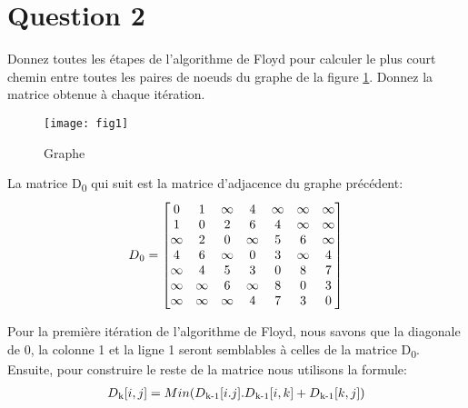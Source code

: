 \documentclass[devoir3.tex]{subfiles}
\begin{document}
\newcommand\hlight[1]{\tikz[overlay, remember picture,baseline=-\the\dimexpr\fontdimen22\textfont2\relax]\node[rectangle,fill=blue!50,rounded corners,fill opacity = 0.2,draw,thick,text opacity =1] {$#1$};}

\section*{Question 2}
Donnez toutes les étapes de l’algorithme de Floyd pour calculer le plus court chemin entre toutes les paires de noeuds du graphe de la figure \ref{fig:fig1}. Donnez la matrice obtenue à chaque itération.

\begin{figure}[H]
	\centering
	\texttt{[image: fig1]}
	\caption{Graphe}
	\label{fig:fig1}
\end{figure}

La matrice D\textsubscript{0} qui suit est la matrice d'adjacence du graphe précédent:
\begin{align*}
	D\textsubscript{0} =
	\begin{bmatrix}
		0 	& 1 	  & \infty 	& 4 	  & \infty 	& \infty & \infty \\
		1 	& 0 	  & 2		& 6	  & 4		& \infty & \infty \\
		\infty  & 2 	  & 0 		& \infty & 5 		& 6 	  & \infty \\
		4 	& 6 	  & \infty   	& 0 	  & 3		& \infty & 4 \\
		\infty  & 4 	  & 5 		& 3 	  & 0 	 	& 8 	  & 7 \\
		\infty  & \infty & 6		& \infty & 8 		& 0 	  & 3 \\
		\infty 	& \infty & \infty 	& 4 	  & 7 		& 3 	 & 0
	\end{bmatrix}
\end{align*}

Pour la première itération de l'algorithme de Floyd, nous savons que la diagonale de 0, la colonne 1 et la ligne 1 seront semblables à celles de la matrice D\textsubscript{0}. Ensuite, pour construire le reste de la matrice nous utilisons la formule:
\begin{align*}
	D\textsubscript{k}[i,j] = Min(D\textsubscript{k-1}[i.j]. D\textsubscript{k-1}[i,k] + D\textsubscript{k-1}[k,j])
\end{align*}
\end{document}
